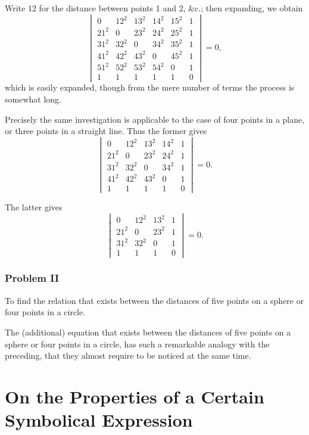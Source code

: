 \documentclass[11pt,a4paper]{book}
\theoremstyle{plain}
\theoremstyle{definition}
\theoremstyle{remark}
\begin{document}
\noindent
Write $12$ for the distance between points 1 and 2, \&c.; then expanding, we obtain
\[
\begin{vmatrix}
0 & 12^2 & 13^2 & 14^2 & 15^2 & 1 \\
21^2 & 0 & 23^2 & 24^2 & 25^2 & 1 \\
31^2 & 32^2 & 0 & 34^2 & 35^2 & 1 \\
41^2 & 42^2 & 43^2 & 0 & 45^2 & 1 \\
51^2 & 52^2 & 53^2 & 54^2 & 0 & 1 \\
1 & 1 & 1 & 1 & 1 & 0
\end{vmatrix} = 0,
\]
which is easily expanded, though from the mere number of terms the process is somewhat long.

Precisely the same investigation is applicable to the case of four points in a plane, or three points in a straight line. Thus the former gives
\[
\begin{vmatrix}
0 & 12^2 & 13^2 & 14^2 & 1 \\
21^2 & 0 & 23^2 & 24^2 & 1 \\
31^2 & 32^2 & 0 & 34^2 & 1 \\
41^2 & 42^2 & 43^2 & 0 & 1 \\
1 & 1 & 1 & 1 & 0
\end{vmatrix} = 0.
\]

The latter gives
\[
\begin{vmatrix}
0 & 12^2 & 13^2 & 1 \\
21^2 & 0 & 23^2 & 1 \\
31^2 & 32^2 & 0 & 1 \\
1 & 1 & 1 & 0
\end{vmatrix} = 0.
\]

\subsection*{Problem II}

To find the relation that exists between the distances of five points on a sphere or four points in a circle.

The (additional) equation that exists between the distances of five points on a sphere or four points in a circle, has such a remarkable analogy with the preceding, that they almost require to be noticed at the same time.

\cleardoublepage

\chapter{On the Properties of a Certain Symbolical Expression}
\label{chap:paper2}
\end{document}
